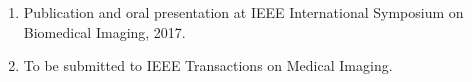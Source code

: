 \listofpublications


\noindent
\begin{enumerate}
    \item Publication and oral presentation at IEEE International Symposium on Biomedical Imaging, 2017.
    \item To be submitted to IEEE Transactions on Medical Imaging.
\end{enumerate} 









